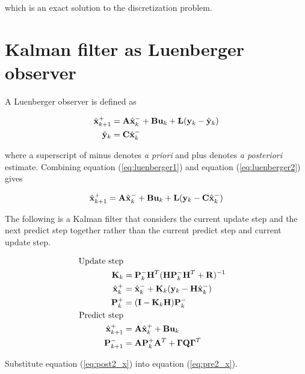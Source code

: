 which is an exact solution to the discretization problem.

\section{Kalman filter as Luenberger observer}
\label{sec:deriv-kalman-luenberger}

A Luenberger observer is defined as

\begin{align}
  \hat{\mathbf{x}}_{k+1}^+ &= \mathbf{A}\hat{\mathbf{x}}_k^- + \mathbf{B}\mathbf{u}_k + \mathbf{L}
    (\mathbf{y}_k - \hat{\mathbf{y}}_k) \label{eq:luenberger1} \\
  \hat{\mathbf{y}}_k &= \mathbf{C} \hat{\mathbf{x}}_k^- \label{eq:luenberger2}
\end{align}

where a superscript of minus denotes \textit{a priori} and plus denotes
\textit{a posteriori} estimate. Combining equation (\ref{eq:luenberger1}) and
equation (\ref{eq:luenberger2}) gives

\begin{equation} \label{eq:luenberger}
  \hat{\mathbf{x}}_{k+1}^+ = \mathbf{A}\hat{\mathbf{x}}_k^- + \mathbf{B}\mathbf{u}_k + \mathbf{L}
    (\mathbf{y}_k - \mathbf{C}\hat{\mathbf{x}}_k^-)
\end{equation}

The following is a Kalman filter that considers the current update step and the
next predict step together rather than the current predict step and current
update step.

\begin{align}
  \text{Update step} \nonumber \\
  \mathbf{K}_k &= \mathbf{P}_k^- \mathbf{H}^T (\mathbf{H}\mathbf{P}_k^- \mathbf{H}^T +
    \mathbf{R})^{-1} \\
  \hat{\mathbf{x}}_k^+ &= \hat{\mathbf{x}}_k^- + \mathbf{K}_k(\mathbf{y}_k -
    \mathbf{H}\hat{\mathbf{x}}_k^-) \label{eq:post2_x} \\
  \mathbf{P}_k^+ &= (\mathbf{I} - \mathbf{K}_k\mathbf{H})\mathbf{P}_k^- \\
  \text{Predict step} \nonumber \\
  \hat{\mathbf{x}}_{k+1}^+ &= \mathbf{A}\hat{\mathbf{x}}_k^+ + \mathbf{B}\mathbf{u}_k
    \label{eq:pre2_x} \\
  \mathbf{P}_{k+1}^- &= \mathbf{A} \mathbf{P}_k^+ \mathbf{A}^T +
    \mathbf{\Gamma}\mathbf{Q}\mathbf{\Gamma}^T
\end{align}

Substitute equation (\ref{eq:post2_x}) into equation (\ref{eq:pre2_x}).

